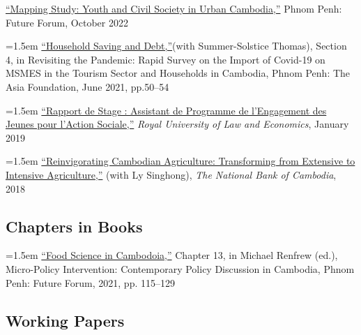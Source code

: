 \documentclass[10pt,a4paper]{article}
\begin{document}
	\href{}{``Mapping Study: Youth and Civil Society in Urban Cambodia,”} Phnom Penh: Future Forum, October 2022\\ \vspace{-.5em} 
	
	\hangindent=1.5em
	\href{https://kosalnith.github.io/research/policies/COVID-19-HHSavingsDebt.pdf}{``Household Saving and Debt,”}(with Summer-Solstice Thomas), Section 4, in Revisiting the Pandemic: Rapid Survey on the Import of Covid-19 on MSMES in the Tourism Sector and Households in Cambodia, Phnom Penh: The Asia Foundation, June 2021, pp.50--54\\ \vspace{-.5em} 
			
	\hangindent=1.5em
	\href{https://www.researchgate.net/publication/330936932_Rapport_du_Stage_Assistant_de_Programme_a_l%27YRDP}{``Rapport de Stage : Assistant de Programme de l'Engagement des Jeunes pour l'Action Sociale,”} \textit{Royal University of Law and Economics}, January 2019 \\ \vspace{-.5em}
			
	\hangindent=1.5em
	\href{https://ideas.repec.org/p/pra/mprapa/93086.html}{``Reinvigorating Cambodian Agriculture: Transforming from Extensive to Intensive Agriculture,”} (with Ly Singhong), \textit{The National Bank of Cambodia}, 2018 
\subsection*{Chapters in Books}

\hangindent=1.5em
\href{https://kosalnith.github.io/research/policies/PolicyBrief-FST.pdf}{``Food Science in Cambodoia,''} Chapter 13, in Michael Renfrew (ed.), Micro-Policy Intervention: Contemporary Policy Discussion in Cambodia, Phnom Penh: Future Forum, 2021, pp. 115–129 

\subsection*{Working Papers}
\end{document}
